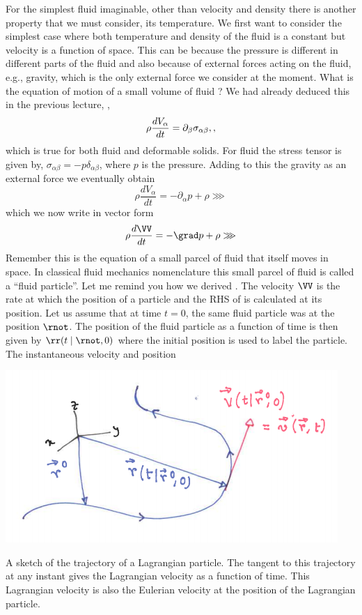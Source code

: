 For the simplest fluid imaginable, other than velocity and density there is another 
property that we must consider, its temperature. We first want to consider the 
simplest case where both temperature and density of the fluid is a constant
but velocity is a function of space. This can be because the pressure is different in 
different parts of the fluid and also because of external forces acting on the fluid, e.g., gravity,
which is the only external force we consider at the moment.  What is the equation of motion 
of a small volume of fluid ? We had already deduced this in the previous lecture, ,
\begin{equation}
\rho\frac{dV_{\alpha}}{dt} = \partial_{\beta}\sigma_{\alpha\beta}, \/,
\label{A2.1:dvdt}
\end{equation}
which is true for both fluid and deformable solids.
For fluid the stress tensor is given by, 
$\sigma_{\alpha\beta} = -p \delta_{\alpha\beta}$, where $p$ is the pressure. 
Adding to this the gravity as an external force we eventually obtain
\begin{equation}
\rho\frac{dV_{\alpha}}{dt} = -\partial_{\alpha}p + \rho \ggg
\end{equation}
which we now write in vector form
\begin{equation}
\rho \frac{d\VV}{dt} = - \grad p + \rho \ggg
\label{A2.1:Lag}
\end{equation}
Remember this is the equation of a small parcel of fluid that itself moves in space.
In classical fluid mechanics nomenclature this small parcel of fluid is called a ``fluid particle''. 
Let me remind you how we derived . The velocity $\VV$ is the rate at which 
the position of a particle and the RHS of  is calculated at its position. 
Let us assume that at time $t=0$, the same fluid particle was at the position $\rnot$. 
The position of the fluid particle as a function of time is then given by $\rr(t\mid\rnot,0)$
where the initial position is used to label the particle. The instantaneous velocity and position 
\begin{marginfigure}
\includegraphics{figures/LagPath.png}
\caption{A sketch of the trajectory of a Lagrangian 
particle. The tangent to this trajectory at any instant gives
the Lagrangian velocity as a function of time. This Lagrangian
velocity is also the Eulerian velocity at the position of the
Lagrangian particle.}
\label{fig:lagpath}
\end{marginfigure}
